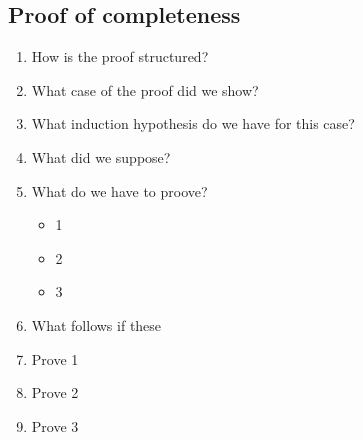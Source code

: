 \documentclass[fleqn]{article}
\begin{document}
\subsection{Proof of completeness}
\begin{enumerate}
    \item How is the proof structured?
    \item What case of the proof did we show?
    \item What induction hypothesis do we have for this case?
    \item What did we suppose?
    \item What do we have to proove?
    \begin{itemize}
        \item 1
        \item 2
        \item 3
    \end{itemize}
    \item What follows if these 
    \item Prove 1
    \item Prove 2
    \item Prove 3
\end{enumerate}
\end{document}
